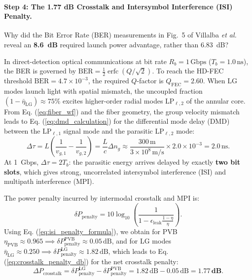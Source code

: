 \documentclass[11pt,a4paper]{article}
\begin{document}
\paragraph{Step 4: The 1.77 dB Crosstalk and Intersymbol Interference (ISI) Penalty.}
Why did the Bit Error Rate (BER) measurements in Fig.~5 of Villalba \emph{et al.}~\cite{Villalba2023} reveal an \textbf{8.6~dB} required launch power advantage, rather than 6.83~dB?

In direct-detection optical communications at bit rate $R_b = 1\,\text{Gbps}$ ($T_b = 1.0\,\text{ns}$), the BER is governed by $\text{BER} = \frac{1}{2} \operatorname{erfc}(Q / \sqrt{2})$. To reach the HD-FEC threshold $\text{BER} = 4.7 \times 10^{-3}$, the required $Q$-factor is $Q_{\text{FEC}} = 2.60$. When LG modes launch light with spatial mismatch, the uncoupled fraction $(1 - \bar{\eta}_{\text{LG}}) \approx 75\%$ excites higher-order radial modes LP$_{\ell, 2}$ of the annular core. From Eq. (\ref{eq:fiber_wf}) and the fiber geometry, the group velocity mismatch leads to Eq. (\ref{eq:dmd_calculation}) for the differential mode delay (DMD) between the LP$_{\ell, 1}$ signal mode and the parasitic LP$_{\ell, 2}$ mode:
\begin{equation}
\Delta \tau = L \left( \frac{1}{v_{g, 1}} - \frac{1}{v_{g, 2}} \right) = \frac{L}{c} \Delta n_g \approx \frac{300\,\text{m}}{3 \times 10^8\,\text{m/s}} \times 2.0 \times 10^{-3} = 2.0\,\text{ns}.
\label{eq:dmd_calculation}
\end{equation}
At 1~Gbps, $\Delta \tau = 2 T_b$: the parasitic energy arrives delayed by exactly \textbf{two bit slots}, which gives strong, uncorrelated intersymbol interference (ISI) and multipath interference (MPI).

The power penalty incurred by intermodal crosstalk and MPI is:
\begin{equation}
\delta P_{\text{penalty}} = 10 \log_{10}\left( \frac{1}{1 - \epsilon_{\text{leak}} \frac{1 - \eta}{\eta}} \right).
\label{eq:isi_penalty_formula}
\end{equation}
Using Eq. (\ref{eq:isi_penalty_formula}), we obtain for PVB $\eta_{\text{PVB}} \approx 0.965 \implies \delta P_{\text{penalty}}^{\text{PVB}} \approx 0.05\,\text{dB}$, and for LG modes $\bar{\eta}_{\text{LG}} \approx 0.250 \implies \delta P_{\text{penalty}}^{\text{LG}} \approx 1.82\,\text{dB}$, which leads to Eq. (\ref{eq:crosstalk_penalty_db}) for the net crosstalk penalty:
\begin{equation}
\Delta P_{\text{crosstalk}} = \delta P_{\text{penalty}}^{\text{LG}} - \delta P_{\text{penalty}}^{\text{PVB}} = 1.82\,\text{dB} - 0.05\,\text{dB} = \mathbf{1.77\,\text{dB}}.
\label{eq:crosstalk_penalty_db}
\end{equation}
\end{document}
